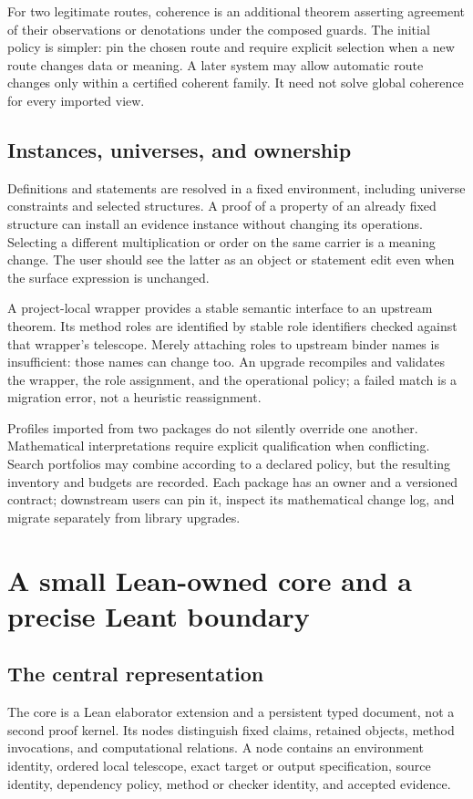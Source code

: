 \documentclass[11pt,a4paper]{article}
\theoremstyle{remark}\newtheorem{example}[proposition]{Example}
\begin{document}
For two legitimate routes, coherence is an additional theorem asserting agreement of their observations or denotations under the composed guards. The initial policy is simpler: pin the chosen route and require explicit selection when a new route changes data or meaning. A later system may allow automatic route changes only within a certified coherent family. It need not solve global coherence for every imported view.

\subsection{Instances, universes, and ownership}
Definitions and statements are resolved in a fixed environment, including universe constraints and selected structures. A proof of a property of an already fixed structure can install an evidence instance without changing its operations. Selecting a different multiplication or order on the same carrier is a meaning change. The user should see the latter as an object or statement edit even when the surface expression is unchanged.

A project-local wrapper provides a stable semantic interface to an upstream theorem. Its method roles are identified by stable role identifiers checked against that wrapper's telescope. Merely attaching roles to upstream binder names is insufficient: those names can change too. An upgrade recompiles and validates the wrapper, the role assignment, and the operational policy; a failed match is a migration error, not a heuristic reassignment.

Profiles imported from two packages do not silently override one another. Mathematical interpretations require explicit qualification when conflicting. Search portfolios may combine according to a declared policy, but the resulting inventory and budgets are recorded. Each package has an owner and a versioned contract; downstream users can pin it, inspect its mathematical change log, and migrate separately from library upgrades.

\section{A small Lean-owned core and a precise Leant boundary}\label{sec:core}
\subsection{The central representation}
The core is a Lean elaborator extension and a persistent typed document, not a second proof kernel. Its nodes distinguish fixed claims, retained objects, method invocations, and computational relations. A node contains an environment identity, ordered local telescope, exact target or output specification, source identity, dependency policy, method or checker identity, and accepted evidence.
\end{document}
